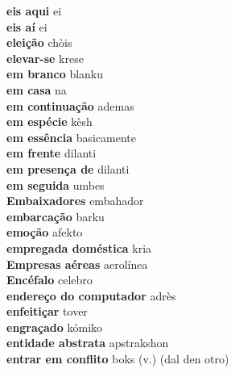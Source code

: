 \textbf{ eis aqui  } ei \\
\textbf{ eis aí  } ei \\
\textbf{ eleição  } chòis \\
\textbf{ elevar-se  } krese \\
\textbf{ em branco  } blanku \\
\textbf{ em casa  } na \\
\textbf{ em continuação  } ademas \\
\textbf{ em espécie  } kèsh \\
\textbf{ em essência  } basicamente \\
\textbf{ em frente  } dilanti \\
\textbf{ em presença de  } dilanti \\
\textbf{ em seguida  } umbes \\
\textbf{ Embaixadores  } embahador \\
\textbf{ embarcação  } barku \\
\textbf{ emoção  } afekto \\
\textbf{ empregada doméstica  } kria \\
\textbf{ Empresas aéreas  } aerolínea \\
\textbf{ Encéfalo  } celebro \\
\textbf{ endereço do computador  } adrès \\
\textbf{ enfeitiçar  } tover \\
\textbf{ engraçado  } kómiko \\
\textbf{ entidade abstrata  } apstrakshon \\
\textbf{ entrar em conflito  } boks (v.) (dal den otro) \\
